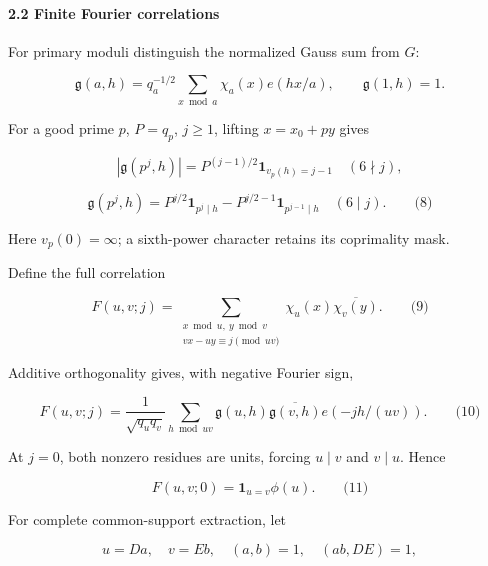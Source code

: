 \hypertarget{cf:sec:A.4}{}

\label{cf:sec:A.4}

\hypertarget{finite-fourier-correlations}{%
\paragraph{2.2 Finite Fourier correlations}\label{finite-fourier-correlations}}

For primary moduli distinguish the normalized Gauss sum from \(G\):

\[
\mathfrak g(a,h)=q_a^{-1/2}\sum_{x\bmod a}\chi_a(x)e(hx/a),\qquad \mathfrak g(1,h)=1.
\]

For a good prime \(p\), \(P=q_p\), \(j\ge1\), lifting \(x=x_0+py\) gives

\[
|\mathfrak g(p^j,h)|=P^{(j-1)/2}\mathbf1_{v_p(h)=j-1}\quad(6\nmid j),
\]

\hypertarget{cf:eq:A.12}{}

\label{cf:eq:A.12}

\[
\mathfrak g(p^j,h)=P^{j/2}\mathbf1_{p^j\mid h}
 -P^{j/2-1}\mathbf1_{p^{j-1}\mid h}\quad(6\mid j).
\qquad\text{(8)}
\]

Here \(v_p(0)=\infty\); a sixth-power character retains its coprimality mask.

Define the full correlation

\hypertarget{cf:eq:A.13}{}

\label{cf:eq:A.13}

\[
F(u,v;j)=\sum_{\substack{x\bmod u,\ y\bmod v\\vx-uy\equiv j\pmod{uv}}}
 \chi_u(x)\overline{\chi_v(y)}.
\qquad\text{(9)}
\]

Additive orthogonality gives, with negative Fourier sign,

\hypertarget{cf:eq:A.14}{}

\label{cf:eq:A.14}

\[
F(u,v;j)=\frac1{\sqrt{q_uq_v}}
 \sum_{h\bmod uv}\mathfrak g(u,h)\overline{\mathfrak g(v,h)}e(-jh/(uv)).
\qquad\text{(10)}
\]

At \(j=0\), both nonzero residues are units, forcing \(u\mid v\) and \(v\mid u\). Hence

\hypertarget{cf:eq:A.15}{}

\label{cf:eq:A.15}

\[
F(u,v;0)=\mathbf1_{u=v}\phi(u).
\qquad\text{(11)}
\]

For complete common-support extraction, let

\[
u=Da,\quad v=Eb,\quad (a,b)=1,\quad (ab,DE)=1,
\]

